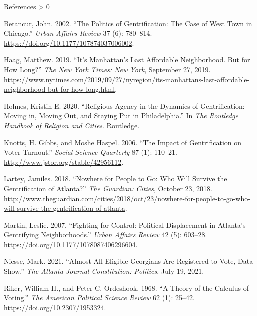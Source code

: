\documentclass[
  ignorenonframetext,
  aspectratio=169]{beamer}
\newlength{\cslhangindent}
\newenvironment{CSLReferences}[2] %
 {%
  \setlength{\parindent}{0pt}
  \ifodd #1 \everypar{\setlength{\hangindent}{\cslhangindent}}\ignorespaces\fi
  \ifnum #2 > 0
  \setlength{\parskip}{#2\baselineskip}
  \fi
 }%
 {}
\begin{document}
\begin{frame}[allowframebreaks]{References}
\protect\hypertarget{references}{}
\hypertarget{refs}{}
\begin{CSLReferences}{1}{0}
\leavevmode\hypertarget{ref-Betancur2002}{}%
Betancur, John. 2002. {``The {Politics} of {Gentrification}: The {Case}
of {West Town} in {Chicago}.''} \emph{Urban Affairs Review} 37 (6):
780--814. \url{https://doi.org/10.1177/107874037006002}.

\leavevmode\hypertarget{ref-Haag2019}{}%
Haag, Matthew. 2019. {``It's {Manhattan}'s {Last Affordable
Neighborhood}. {But} for {How Long}?''} \emph{The New York Times: New
York}, September 27, 2019.
\url{https://www.nytimes.com/2019/09/27/nyregion/its-manhattans-last-affordable-neighborhood-but-for-how-long.html}.

\leavevmode\hypertarget{ref-Holmes2020}{}%
Holmes, Kristin E. 2020. {``Religious Agency in the Dynamics of
Gentrification: Moving in, Moving Out, and Staying Put in
{Philadelphia}.''} In \emph{The {Routledge Handbook} of {Religion} and
{Cities}}. {Routledge}.

\leavevmode\hypertarget{ref-Knotts2006}{}%
Knotts, H. Gibbs, and Moshe Haspel. 2006. {``The {Impact} of
{Gentrification} on {Voter Turnout}.''} \emph{Social Science Quarterly}
87 (1): 110--21. \url{http://www.jstor.org/stable/42956112}.

\leavevmode\hypertarget{ref-Lartey2018}{}%
Lartey, Jamiles. 2018. {``Nowhere for People to Go: Who Will Survive the
Gentrification of {Atlanta}?''} \emph{The Guardian: Cities}, October 23,
2018.
\url{http://www.theguardian.com/cities/2018/oct/23/nowhere-for-people-to-go-who-will-survive-the-gentrification-of-atlanta}.

\leavevmode\hypertarget{ref-Martin2007a}{}%
Martin, Leslie. 2007. {``Fighting for {Control}: Political
{Displacement} in {Atlanta}'s {Gentrifying Neighborhoods}.''}
\emph{Urban Affairs Review} 42 (5): 603--28.
\url{https://doi.org/10.1177/1078087406296604}.

\leavevmode\hypertarget{ref-Niesse2021a}{}%
Niesse, Mark. 2021. {``Almost All Eligible {Georgians} Are Registered to
Vote, Data Show.''} \emph{The Atlanta Journal-Constitution: Politics},
July 19, 2021.

\leavevmode\hypertarget{ref-Riker1968}{}%
Riker, William H., and Peter C. Ordeshook. 1968. {``A {Theory} of the
{Calculus} of {Voting}.''} \emph{The American Political Science Review}
62 (1): 25--42. \url{https://doi.org/10.2307/1953324}.


\end{CSLReferences}
\end{frame}
\end{document}
